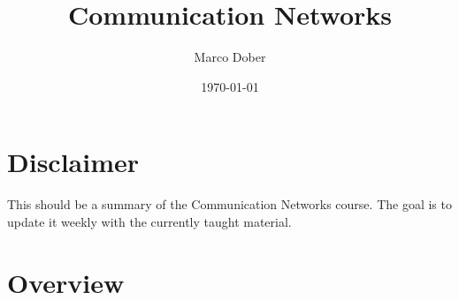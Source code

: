 \documentclass[a4paper, fontsize=8pt, landscape, DIV=1]{scrartcl}
\title{Communication Networks}
\author{Marco Dober}
\date{\today}
\begin{document}
	\setcounter{secnumdepth}{3} %
	\begin{multicols*}{4}
		\section*{Disclaimer}
			This should be a summary of the Communication Networks course. The goal is to update it weekly with the currently taught material.  	
			\newpage

		\maketitle 
		\thispagestyle{fancy}
		
		\section{Overview}

\end{multicols*}
\end{document}
